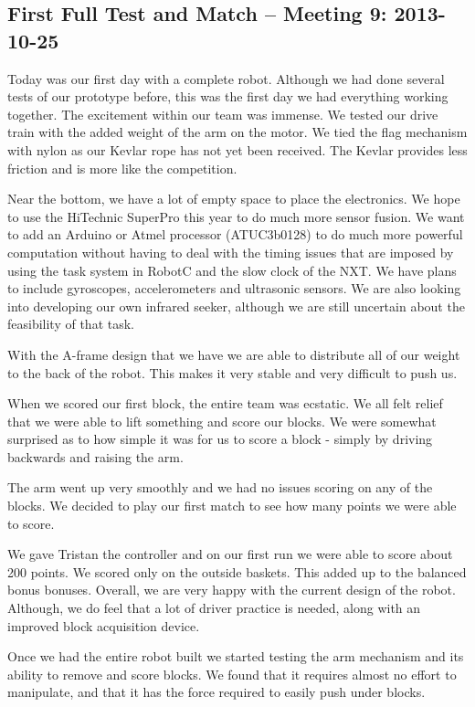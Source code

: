 \newpage \subsection{First Full Test and Match -- Meeting 9: 2013-10-25}
Today was our first day with a complete robot. Although we had done several tests of our prototype before, this was the first day we had everything working together. The excitement within our team was immense. We tested our drive train with the added weight of the arm on the motor. We tied the flag mechanism with nylon as our Kevlar rope has not yet been received. The Kevlar provides less friction and is more like the competition.

Near the bottom, we have a lot of empty space to place the electronics. We hope to use the HiTechnic SuperPro this year to do much more sensor fusion. We want to add an Arduino or Atmel processor (ATUC3b0128) to do much more powerful computation without having to deal with the timing issues that are imposed by using the task system in RobotC and the slow clock of the NXT. We have plans to include gyroscopes, accelerometers and ultrasonic sensors. We are also looking into developing our own infrared seeker, although we are still uncertain about the feasibility of that task. 

With the A-frame design that we have we are able to distribute all of our weight to the back of the robot. This makes it very stable and very difficult to push us. 

When we scored our first block, the entire team was ecstatic. We all felt relief that we were able to lift something and score our blocks. We were somewhat surprised as to how simple it was for us to score a block - simply by driving backwards and raising the arm.

The arm went up very smoothly and we had no issues scoring on any of the blocks. We decided to play our first match to see how many points we were able to score.

We gave Tristan the controller and on our first run we were able to score about 200 points. We scored only on the outside baskets. This added up to the balanced bonus bonuses. Overall, we are very happy with the current design of the robot. Although, we do feel that a lot of driver practice is needed, along with an improved block acquisition device. 

Once we had the entire robot built we started testing the arm mechanism and its ability to remove and score blocks. We found that it requires almost no effort to manipulate, and that it has the force required to easily push under blocks.

